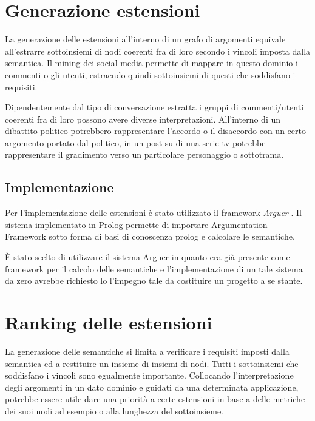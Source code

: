 




\section {Generazione estensioni}
La generazione delle estensioni all'interno di un grafo di argomenti equivale all'estrarre sottoinsiemi di nodi coerenti fra di loro secondo i vincoli imposta dalla semantica. Il mining dei social media permette di mappare in questo dominio i commenti o gli utenti, estraendo quindi sottoinsiemi di questi che soddisfano i requisiti. 

Dipendentemente dal tipo di conversazione estratta i gruppi di commenti/utenti coerenti fra di loro possono avere diverse interpretazioni. All'interno di un dibattito politico potrebbero rappresentare l'accordo o il disaccordo con un certo argomento portato dal politico, in un post su di una serie tv potrebbe rappresentare il gradimento verso un particolare personaggio o sottotrama. 

\subsection {Implementazione}
Per l'implementazione delle estensioni è stato utilizzato il framework \textit{Arguer} \cite{}. Il sistema implementato in Prolog permette di importare Argumentation Framework sotto forma di basi di conoscenza prolog e calcolare le semantiche. 

È stato scelto di utilizzare il sistema Arguer in quanto era già presente come framework per il calcolo delle semantiche e l'implementazione di un tale sistema da zero avrebbe richiesto lo l'impegno tale da costituire un progetto a se stante.


\section {Ranking delle estensioni}
La generazione delle semantiche si limita a verificare i requisiti imposti dalla semantica ed a restituire un insieme di insiemi di nodi. Tutti i sottoinsiemi che soddisfano i vincoli sono egualmente importante. Collocando l'interpretazione degli argomenti in un dato dominio e guidati da una determinata applicazione, potrebbe essere utile dare una priorità a certe estensioni in base a delle metriche dei suoi nodi ad esempio o alla lunghezza del sottoinsieme. 

